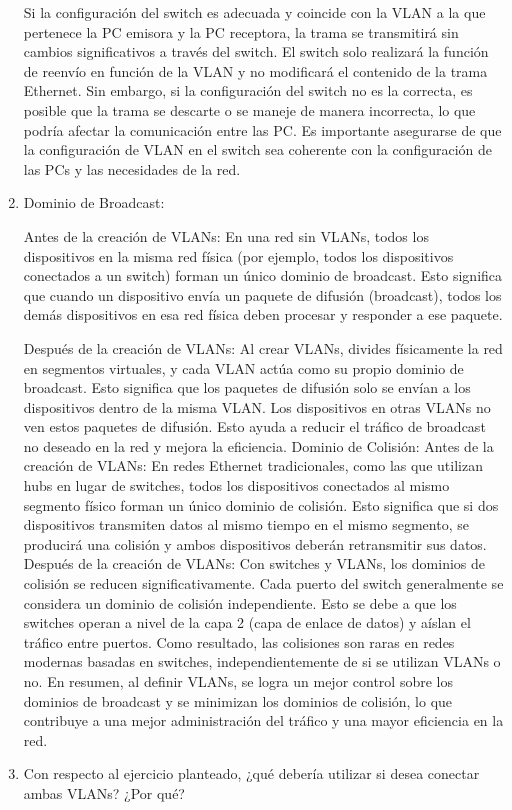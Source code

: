 \documentclass[a4paper]{article}
\begin{document}
\begin{enumerate}
Si la configuración del switch es adecuada y coincide con la VLAN a la que pertenece la PC emisora y la PC receptora, la trama se transmitirá sin cambios significativos a través del switch. El switch solo realizará la función de reenvío en función de la VLAN y no modificará el contenido de la trama Ethernet.
Sin embargo, si la configuración del switch no es la correcta, es posible que la trama se descarte o se maneje de manera incorrecta, lo que podría afectar la comunicación entre las PC. Es importante asegurarse de que la configuración de VLAN en el switch sea coherente con la configuración de las PCs y las necesidades de la red.
\item 

Dominio de Broadcast:

Antes de la creación de VLANs: En una red sin VLANs, todos los dispositivos en la misma red física (por ejemplo, todos los dispositivos conectados a un switch) forman un único dominio de broadcast. Esto significa que cuando un dispositivo envía un paquete de difusión (broadcast), todos los demás dispositivos en esa red física deben procesar y responder a ese paquete.

Después de la creación de VLANs: Al crear VLANs, divides físicamente la red en segmentos virtuales, y cada VLAN actúa como su propio dominio de broadcast. Esto significa que los paquetes de difusión solo se envían a los dispositivos dentro de la misma VLAN. Los dispositivos en otras VLANs no ven estos paquetes de difusión. Esto ayuda a reducir el tráfico de broadcast no deseado en la red y mejora la eficiencia.
Dominio de Colisión:
Antes de la creación de VLANs: En redes Ethernet tradicionales, como las que utilizan hubs en lugar de switches, todos los dispositivos conectados al mismo segmento físico forman un único dominio de colisión. Esto significa que si dos dispositivos transmiten datos al mismo tiempo en el mismo segmento, se producirá una colisión y ambos dispositivos deberán retransmitir sus datos.
Después de la creación de VLANs: Con switches y VLANs, los dominios de colisión se reducen significativamente. Cada puerto del switch generalmente se considera un dominio de colisión independiente. Esto se debe a que los switches operan a nivel de la capa 2 (capa de enlace de datos) y aíslan el tráfico entre puertos. Como resultado, las colisiones son raras en redes modernas basadas en switches, independientemente de si se utilizan VLANs o no.
En resumen, al definir VLANs, se logra un mejor control sobre los dominios de broadcast y se minimizan los dominios de colisión, lo que contribuye a una mejor administración del tráfico y una mayor eficiencia en la red.
\item Con respecto al ejercicio planteado, ¿qué debería utilizar si desea conectar ambas VLANs? ¿Por qué?


\end{enumerate}
\end{document}
